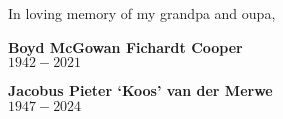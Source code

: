 \begin{dedication} \noindent


    In loving memory of my grandpa and oupa,

    \vspace{\baselineskip}

    \textbf{\large Boyd McGowan Fichardt Cooper} \\
    $1942 - 2021$

    \vspace{\baselineskip}

    \textbf{\large Jacobus Pieter `Koos' van der Merwe} \\
    $1947 - 2024$


\end{dedication}

